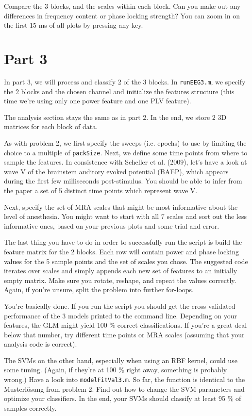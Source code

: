 \documentclass[10pt,a4paper,notitlepage]{report}
\begin{document}
Compare the 3 blocks, and the scales within each block. Can you make out any differences in frequency content or phase locking strength? You can zoom in on the first 15 ms of all plots by pressing any key.


\section*{Part 3}
In part 3, we will process and classify 2 of the 3 blocks. In \texttt{runEEG3.m}, we specify the 2 blocks and the chosen channel and initialize the features structure (this time we're using only one power feature and one PLV feature).

The analysis section stays the same as in part 2. In the end, we store 2 3D matrices for each block of data.

As with problem 2, we first specify the sweeps (i.e. epochs) to use by limiting the choice to a multiple of \texttt{packSize}. Next, we define some time points from where to sample the features. In consistence with Scheller et al. (2009), let's have a look at wave V of the brainstem auditory evoked potential (BAEP), which appears during the first few milliseconds post-stimulus. You should be able to infer from the paper a set of 5 distinct time points which represent wave V.

Next, specify the set of MRA scales that might be most informative about the level of anesthesia. You might want to start with all 7 scales and sort out the less informative ones, based on your previous plots and some trial and error.

The last thing you have to do in order to successfully run the script is build the feature matrix for the 2 blocks. Each row will contain power and phase locking values for the 5 sample points and the set of scales you chose. The suggested code iterates over scales and simply appends each new set of features to an initially empty matrix. Make sure you rotate, reshape, and repeat the values correctly. Again, if you're unsure, split the problem into further for-loops.

You're basically done. If you run the script you should get the cross-validated performance of the 3 models printed to the command line. Depending on your features, the GLM might yield 100 \% correct classifications. If you're a great deal below that number, try different time points or MRA scales (assuming that your analysis code is correct).

The SVMs on the other hand, especially when using an RBF kernel, could use some tuning. (Again, if they're at 100 \% right away, something is probably wrong.) Have a look into \texttt{modelFitVal3.m}. So far, the function is identical to the Musterlösung from problem 2. Find out how to change the SVM parameters and optimize your classifiers. In the end, your SVMs should classify at least 95 \% of samples correctly.
\end{document}
